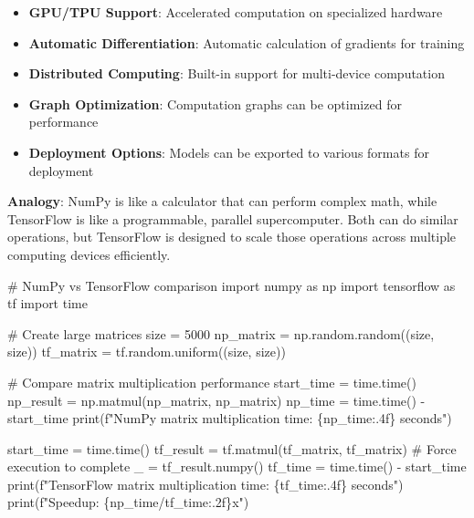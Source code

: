 \documentclass[
  letterpaper,
  DIV=11,
  numbers=noendperiod]{scrreprt}
\newenvironment{Shaded}{\begin{snugshade}}{\end{snugshade}}
\newcommand{\BuiltInTok}[1]{\textcolor[rgb]{0.00,0.23,0.31}{#1}}
\newcommand{\CommentTok}[1]{\textcolor[rgb]{0.37,0.37,0.37}{#1}}
\newcommand{\DecValTok}[1]{\textcolor[rgb]{0.68,0.00,0.00}{#1}}
\newcommand{\ImportTok}[1]{\textcolor[rgb]{0.00,0.46,0.62}{#1}}
\newcommand{\NormalTok}[1]{\textcolor[rgb]{0.00,0.23,0.31}{#1}}
\newcommand{\OperatorTok}[1]{\textcolor[rgb]{0.37,0.37,0.37}{#1}}
\newcommand{\SpecialCharTok}[1]{\textcolor[rgb]{0.37,0.37,0.37}{#1}}
\newcommand{\SpecialStringTok}[1]{\textcolor[rgb]{0.13,0.47,0.30}{#1}}
\providecommand{\tightlist}{%
  \setlength{\itemsep}{0pt}\setlength{\parskip}{0pt}}\usepackage{longtable,booktabs,array}
\begin{document}
\begin{itemize}
\tightlist
\item
  \textbf{GPU/TPU Support}: Accelerated computation on specialized
  hardware
\item
  \textbf{Automatic Differentiation}: Automatic calculation of gradients
  for training
\item
  \textbf{Distributed Computing}: Built-in support for multi-device
  computation
\item
  \textbf{Graph Optimization}: Computation graphs can be optimized for
  performance
\item
  \textbf{Deployment Options}: Models can be exported to various formats
  for deployment
\end{itemize}

\textbf{Analogy}: NumPy is like a calculator that can perform complex
math, while TensorFlow is like a programmable, parallel supercomputer.
Both can do similar operations, but TensorFlow is designed to scale
those operations across multiple computing devices efficiently.

\begin{Shaded}
\begin{Highlighting}[]
\CommentTok{\# NumPy vs TensorFlow comparison}
\ImportTok{import}\NormalTok{ numpy }\ImportTok{as}\NormalTok{ np}
\ImportTok{import}\NormalTok{ tensorflow }\ImportTok{as}\NormalTok{ tf}
\ImportTok{import}\NormalTok{ time}

\CommentTok{\# Create large matrices}
\NormalTok{size }\OperatorTok{=} \DecValTok{5000}
\NormalTok{np\_matrix }\OperatorTok{=}\NormalTok{ np.random.random((size, size))}
\NormalTok{tf\_matrix }\OperatorTok{=}\NormalTok{ tf.random.uniform((size, size))}

\CommentTok{\# Compare matrix multiplication performance}
\NormalTok{start\_time }\OperatorTok{=}\NormalTok{ time.time()}
\NormalTok{np\_result }\OperatorTok{=}\NormalTok{ np.matmul(np\_matrix, np\_matrix)}
\NormalTok{np\_time }\OperatorTok{=}\NormalTok{ time.time() }\OperatorTok{{-}}\NormalTok{ start\_time}
\BuiltInTok{print}\NormalTok{(}\SpecialStringTok{f"NumPy matrix multiplication time: }\SpecialCharTok{\{}\NormalTok{np\_time}\SpecialCharTok{:.4f\}}\SpecialStringTok{ seconds"}\NormalTok{)}

\NormalTok{start\_time }\OperatorTok{=}\NormalTok{ time.time()}
\NormalTok{tf\_result }\OperatorTok{=}\NormalTok{ tf.matmul(tf\_matrix, tf\_matrix)}
\CommentTok{\# Force execution to complete}
\NormalTok{\_ }\OperatorTok{=}\NormalTok{ tf\_result.numpy()}
\NormalTok{tf\_time }\OperatorTok{=}\NormalTok{ time.time() }\OperatorTok{{-}}\NormalTok{ start\_time}
\BuiltInTok{print}\NormalTok{(}\SpecialStringTok{f"TensorFlow matrix multiplication time: }\SpecialCharTok{\{}\NormalTok{tf\_time}\SpecialCharTok{:.4f\}}\SpecialStringTok{ seconds"}\NormalTok{)}
\BuiltInTok{print}\NormalTok{(}\SpecialStringTok{f"Speedup: }\SpecialCharTok{\{}\NormalTok{np\_time}\OperatorTok{/}\NormalTok{tf\_time}\SpecialCharTok{:.2f\}}\SpecialStringTok{x"}\NormalTok{)}
\end{Highlighting}
\end{Shaded}
\end{document}
